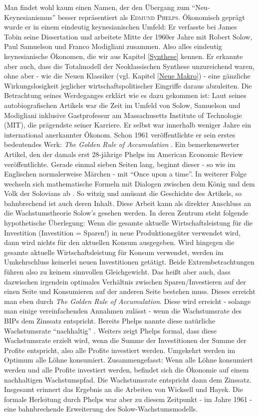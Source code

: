 Man findet wohl kaum einen Namen, der den Übergang zum "`Neu-Keynesianismus"' besser repräsentiert als \textsc{Edmund Phelps}. Ökonomisch geprägt wurde er in einem eindeutig keynesianischen Umfeld: Er verfasste bei James Tobin seine Dissertation und arbeitete Mitte der 1960er Jahre mit Robert Solow, Paul Samuelson und Franco Modigliani zusammen. Also alles eindeutig keynesianische Ökonomen, die wir aus Kapitel \ref{Synthese} kennen. Er erkannte aber auch, dass die Totalmodell der Neoklassischen Synthese unzureichend waren, ohne aber - wie die Neuen Klassiker (vgl. Kapitel \ref{Neue Makro}) - eine gänzliche Wirkungslosigkeit jeglicher wirtschaftspolitischer Eingriffe daraus abzuleiten. Die Betrachtung seines Werdeganges erklärt wie es dazu gekommen ist: Laut seines autobiografischen Artikels \textcite[S. 93]{Heertje1995} war die Zeit im Umfeld von Solow, Samuelson und Modigliani inklusive Gastprofessur am Massachusetts Institute of Technologie (MIT), die prägendste seiner Karriere. Er selbst war innerhalb weniger Jahre ein international anerkannter Ökonom. Schon 1961 veröffentlichte er sein erstes bedeutendes Werk: \textit{The Golden Rule of Accumulation} \parencite{Phelps1961}. Ein bemerkenswerter Artikel, den der damals erst 28-jährige Phelps im American Economic Review veröffentlichte. Gerade einmal sieben Seiten lang, beginnt dieser - so wie im Englischen normalerweise Märchen  - mit "`Once upon a time"'. In weiterer Folge wechseln sich mathematische Formeln mit Dialogen zwischen dem König und dem Volk der Solovians ab \parencite[S. 640]{Phelps1961}. So witzig und amüsant die Geschichte des Artikels, so bahnbrechend ist auch deren Inhalt. Diese Arbeit kann als direkter Anschluss an die Wachstumstheorie Solow's gesehen werden. In deren Zentrum steht folgende hypothetische Überlegung: Wenn die gesamte aktuelle Wirtschaftsleistung für die Investition (Investition = Sparen!) in neue Produktionsgüter verwendet wird, dann wird nichts für den aktuellen Konsum ausgegeben. Wird hingegen die gesamte aktuelle Wirtschaftsleistung für Konsum verwendet, werden im Umkehrschluss keinerlei neuen Investitionen getätigt. Beide Extrembetrachtungen führen also zu keinem sinnvollen Gleichgewicht. Das heißt aber auch, dass dazwischen irgendein optimales Verhältnis zwischen Sparen/Investieren auf der einen Seite und Konsumieren auf der anderen Seite bestehen muss. Dieses erreicht man eben durch \textit{The Golden Rule of Accumulation}. Diese wird erreicht - solange man einige vereinfachenden Annahmen zulässt - wenn die Wachstumsrate des BIPs dem Zinssatz entspricht. Bereits Phelps nannte diese natürliche Wachstumsrate "`nachhaltig"' \parencite[S. 638]{Phelps1961}. Weiters zeigt Phelps formal, dass diese Wachstumsrate erzielt wird, wenn die Summe der Investitionen der Summe der Profite entspricht, also alle Profite investiert werden. Umgekehrt werden im Optimum alle Löhne konsumiert. Zusammengefasst: Wenn alle Löhne konsumiert werden und alle Profite investiert werden, befindet sich die Ökonomie auf einem nachhaltigen Wachstumspfad. Die Wachstumsrate entspricht dann dem Zinssatz. Insgesamt erinnert das Ergebnis an die Arbeiten von Wicksell und Hayek. Die formale Herleitung durch Phelps war aber zu diesem Zeitpunkt - im Jahre 1961 - eine bahnbrechende Erweiterung des Solow-Wachstumsmodells.

